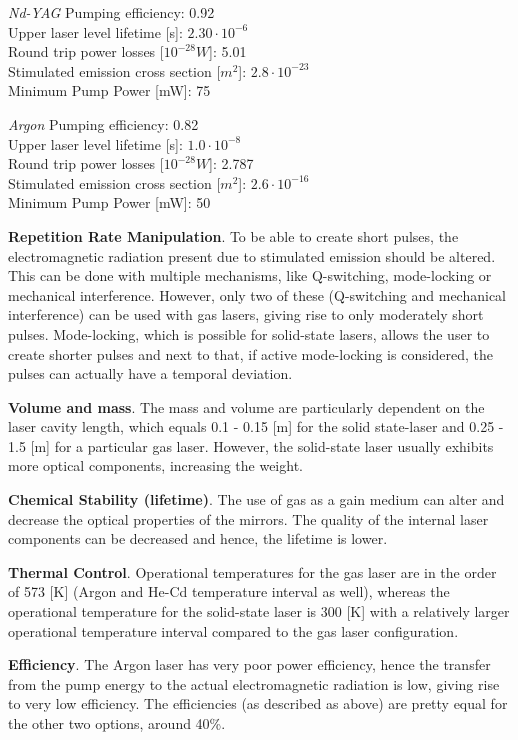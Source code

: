 \textit{Nd-YAG}
Pumping efficiency: 0.92\\
Upper \acs{laser} level lifetime [s]: $2.30\cdot10^{-6}$\\
Round trip power losses [$10^{-28} W$]: 5.01\\
Stimulated emission cross section [$m^{2}$]: $2.8\cdot10^{-23}$\\
Minimum Pump Power [mW]: 75

\textit{Argon}
Pumping efficiency: 0.82\\
Upper \acs{laser} level lifetime [s]: $1.0\cdot10^{-8}$\\
Round trip power losses [$10^{-28} W$]:  2.787\\
Stimulated emission cross section [$m^{2}$]: $2.6\cdot10^{-16}$\\
Minimum Pump Power [mW]: 50

\textbf{Repetition Rate Manipulation}. To be able to create short pulses, the electromagnetic radiation present due to stimulated emission should be altered. This can be done with multiple mechanisms, like Q-switching, mode-locking or mechanical interference. However, only two of these (Q-switching and mechanical interference) can be used with gas \acs{laser}s, giving rise to only moderately short pulses. Mode-locking, which is possible for solid-state \acs{laser}s, allows the user to create shorter pulses and next to that, if active mode-locking is considered, the pulses can actually have a temporal deviation. 
 
\textbf{Volume and mass}. 
The mass and volume are particularly dependent on the \acs{laser} cavity length, which equals 0.1 - 0.15 [m] for the solid state-laser and 0.25 - 1.5 [m] for a particular gas \acs{laser}. However, the solid-state \acs{laser} usually exhibits more optical components, increasing the weight.  

\textbf{Chemical Stability (lifetime)}. The use of gas as a gain medium can alter and decrease the optical properties of the mirrors. The quality of the internal \acs{laser} components can be decreased and hence, the lifetime is lower.   

\textbf{Thermal Control}. Operational temperatures for the gas \acs{laser} are in the order of 573 [K] (Argon and He-Cd temperature interval as well), whereas the operational temperature for the solid-state \acs{laser} is 300 [K] with a relatively larger operational temperature interval compared to the gas \acs{laser} configuration.  

\textbf{Efficiency}. The Argon \acs{laser} has very poor power efficiency, hence the transfer from the pump energy to the actual electromagnetic radiation is low, giving rise to very low efficiency. The efficiencies (as described as above) are pretty equal for the other two options, around 40\%.
 
